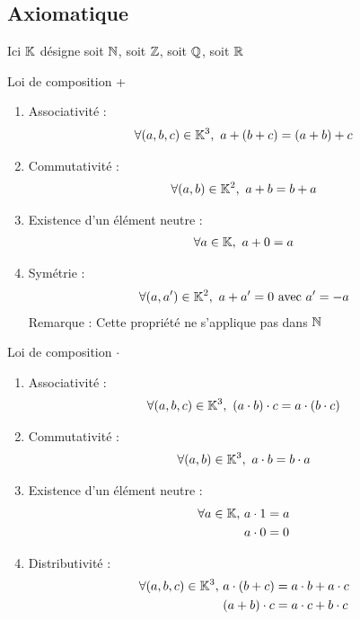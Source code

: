 \subsection{Axiomatique}
Ici $\mathbb{K}$ désigne soit $\mathbb{N}$, soit $\mathbb{Z}$, soit $\mathbb{Q}$, soit $\mathbb{R}$
\begin{proposition}{Loi de composition +}
	\begin{enumerate}
		\item Associativité :
		\begin{align*}
			\forall(a, b, c) \in \mathbb{K}^3,\ a + (b + c) = (a + b) + c
		\end{align*}
		\item Commutativité :
		\begin{align*}
			\forall(a, b) \in \mathbb{K}^2,\ a + b = b + a
		\end{align*}
		\item Existence d'un élément neutre : 
		\begin{align*}
			\forall a \in \mathbb{K},\ a + 0 = a
		\end{align*}
		\item Symétrie :
		\begin{align*}
			\forall(a, a') \in \mathbb{K}^2,\ a + a' = 0 \textnormal{ avec } a' = -a
		\end{align*}
		Remarque : Cette propriété ne s'applique pas dans $\mathbb{N}$
	\end{enumerate}
\end{proposition}
\clearpage
\begin{proposition}{Loi de composition $\cdot$}
	\begin{enumerate}
		\item Associativité :
		\begin{align*}
			\forall (a, b, c) \in \mathbb{K}^3,\ (a \cdot b) \cdot c = a \cdot (b \cdot c)
		\end{align*}
		\item Commutativité :
		\begin{align*}
			\forall (a, b) \in \mathbb{K}^3,\ a \cdot b = b \cdot a
		\end{align*}
		\item Existence d'un élément neutre :
		\begin{align*}
			\forall a \in \mathbb{K}, \ & a \cdot 1 = a \\
			& a \cdot 0 = 0
		\end{align*}
		\item Distributivité : 
		\begin{align*}
			\forall (a, b, c) \in \mathbb{K}^3,\ &a \cdot (b + c) = a \cdot b + a \cdot c \\
			&(a + b) \cdot c = a \cdot c + b \cdot c
		\end{align*}
	\end{enumerate}
\end{proposition}
